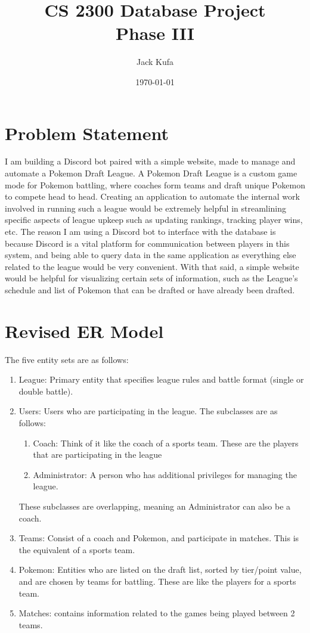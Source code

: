 \documentclass{article}
\title{CS 2300 Database Project \\ Phase III}
\author{Jack Kufa}
\date{\today}
\begin{document}
\maketitle

\section*{Problem Statement}
I am building a Discord bot paired with a simple website, made to manage and automate a Pokemon Draft League. A Pokemon Draft League is a custom game mode
for Pokemon battling, where coaches form teams and draft unique Pokemon to compete head to head. Creating an application to automate 
the internal work involved in running such a league would be extremely helpful in streamlining specific aspects of league upkeep such as updating rankings,
tracking player wins, etc. The reason I am using a Discord bot to interface with the database
is because Discord is a vital platform for communication between players in this system, and being able to query data in the same
application as everything else related to the league would be very convenient. With that said, a simple website would be helpful for visualizing certain sets of information,
such as the League's schedule and list of Pokemon that can be drafted or have already been drafted.

\section*{Revised ER Model}

The five entity sets are as follows:
\begin{enumerate}
    \item League: Primary entity that specifies league rules and battle format (single or double battle).
    \item Users: Users who are participating in the league. The subclasses are as follows: \begin{enumerate}
        \item Coach: Think of it like the coach of a sports team. These are the players that are participating in the league
        \item Administrator: A person who has additional privileges for managing the league.
    \end{enumerate}
    These subclasses are overlapping, meaning an Administrator can also be a coach.
    \item Teams: Consist of a coach and Pokemon, and participate in matches. This is the equivalent of a sports team.
    \item Pokemon: Entities who are listed on the draft list, sorted by tier/point value, and are chosen by teams for battling. These are like the players for a sports team.
    \item Matches: contains information related to the games being played between 2 teams.
\end{enumerate}
\end{document}
